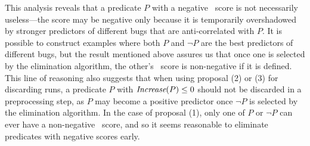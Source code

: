 This analysis reveals that a predicate $P$ with a negative \increase\
score is not necessarily useless---the score may be negative only
because it is temporarily overshadowed by stronger predictors of
different bugs that are anti-correlated with $P$.  It is possible to
construct examples where both $P$ and $\neg P$ are the best predictors
of different bugs, but the result mentioned above assures us that once
one is selected by the elimination algorithm, the other's
\increase\ score is non-negative if it is defined.  This line of
reasoning also suggests that when using proposal (2) or (3) for discarding runs,
a predicate $P$ with $\textit{Increase}(P) \leq 0$ should not be
discarded in a preprocessing step, as $P$ may become a positive
predictor once $\neg P$ is selected by the elimination algorithm.  In
the case of proposal (1), only one of $P$ or $\neg P$ can ever have a
non-negative \increase\ score, and so it seems reasonable to eliminate
predicates with negative scores early.

